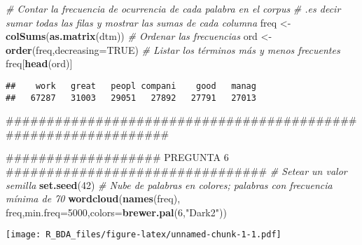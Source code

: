 \documentclass[]{article}
\newenvironment{Shaded}{\begin{snugshade}}{\end{snugshade}}
\newcommand{\KeywordTok}[1]{\textcolor[rgb]{0.13,0.29,0.53}{\textbf{#1}}}
\newcommand{\DataTypeTok}[1]{\textcolor[rgb]{0.13,0.29,0.53}{#1}}
\newcommand{\DecValTok}[1]{\textcolor[rgb]{0.00,0.00,0.81}{#1}}
\newcommand{\StringTok}[1]{\textcolor[rgb]{0.31,0.60,0.02}{#1}}
\newcommand{\CommentTok}[1]{\textcolor[rgb]{0.56,0.35,0.01}{\textit{#1}}}
\newcommand{\OtherTok}[1]{\textcolor[rgb]{0.56,0.35,0.01}{#1}}
\newcommand{\NormalTok}[1]{#1}
\begin{document}
\begin{Shaded}
\begin{Highlighting}[]
\CommentTok{# Contar la frecuencia de ocurrencia de cada palabra en el corpus}
\CommentTok{# .es decir sumar todas las filas y mostrar las sumas de cada columna}
\NormalTok{freq <-}\StringTok{ }\KeywordTok{colSums}\NormalTok{(}\KeywordTok{as.matrix}\NormalTok{(dtm))}
\CommentTok{# Ordenar las frecuencias}
\NormalTok{ord <-}\StringTok{ }\KeywordTok{order}\NormalTok{(freq,}\DataTypeTok{decreasing=}\OtherTok{TRUE}\NormalTok{)}
\CommentTok{# Listar los términos más y menos frecuentes}
\NormalTok{freq[}\KeywordTok{head}\NormalTok{(ord)]}
\end{Highlighting}
\end{Shaded}

\begin{verbatim}
##    work   great   peopl compani    good   manag 
##   67287   31003   29051   27892   27791   27013
\end{verbatim}

\begin{Shaded}
\begin{Highlighting}[]
\NormalTok{###############################################################}

\NormalTok{################### PREGUNTA 6 ################################}
\CommentTok{# Setear un valor semilla}
\KeywordTok{set.seed}\NormalTok{(}\DecValTok{42}\NormalTok{)}
\CommentTok{# Nube de palabras en colores; palabras con frecuencia mínima de 70}
\KeywordTok{wordcloud}\NormalTok{(}\KeywordTok{names}\NormalTok{(freq), freq,}\DataTypeTok{min.freq=}\DecValTok{5000}\NormalTok{,}\DataTypeTok{colors=}\KeywordTok{brewer.pal}\NormalTok{(}\DecValTok{6}\NormalTok{,}\StringTok{"Dark2"}\NormalTok{)) }
\end{Highlighting}
\end{Shaded}

\texttt{[image: R\_BDA\_files/figure-latex/unnamed-chunk-1-1.pdf]}
\end{document}
